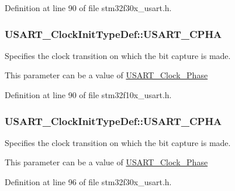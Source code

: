 Definition at line 90 of file stm32f30x\-\_\-usart.\-h.

\hypertarget{struct_u_s_a_r_t___clock_init_type_def_abda3a2172bd5819e1c207dc0d1c822d8}{
\subsubsection[{U\-S\-A\-R\-T\-\_\-\-C\-P\-H\-A}]{ U\-S\-A\-R\-T\-\_\-\-Clock\-Init\-Type\-Def\-::\-U\-S\-A\-R\-T\-\_\-\-C\-P\-H\-A}}\label{struct_u_s_a_r_t___clock_init_type_def_abda3a2172bd5819e1c207dc0d1c822d8}
\begin{DoxyVerb}    Specifies the clock transition on which the bit capture is made.
\end{DoxyVerb}
 This parameter can be a value of \hyperlink{group___u_s_a_r_t___clock___phase}{U\-S\-A\-R\-T\-\_\-\-Clock\-\_\-\-Phase} 

Definition at line 90 of file stm32f10x\-\_\-usart.\-h.

\hypertarget{struct_u_s_a_r_t___clock_init_type_def_a167022a48aeaba5515054bbba2929986}{
\subsubsection[{U\-S\-A\-R\-T\-\_\-\-C\-P\-H\-A}]{ U\-S\-A\-R\-T\-\_\-\-Clock\-Init\-Type\-Def\-::\-U\-S\-A\-R\-T\-\_\-\-C\-P\-H\-A}}\label{struct_u_s_a_r_t___clock_init_type_def_a167022a48aeaba5515054bbba2929986}
\begin{DoxyVerb}              Specifies the clock transition on which the bit capture is made.
\end{DoxyVerb}
 This parameter can be a value of \hyperlink{group___u_s_a_r_t___clock___phase}{U\-S\-A\-R\-T\-\_\-\-Clock\-\_\-\-Phase} 

Definition at line 96 of file stm32f30x\-\_\-usart.\-h.

